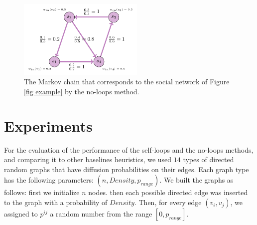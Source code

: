 \documentclass[sigconf,anonymous]{aamas}
\begin{document}
\begin{figure}[hbpt] 
    \centering
    \includegraphics[width= 6cm]{no_loop_markov_chain.pdf}
  \caption{The Markov chain that corresponds to the social network of Figure \ref{fig example} by the no-loops method.
  }
    \label{fig no-loops mc}
\end{figure}


%















\section{Experiments}

For the evaluation of the performance of the self-loops and the no-loops methods, and comparing it to other baselines heuristics, we used $14$ types of directed random graphs that have diffusion probabilities on their edges. Each graph type has the following parameters: $(n, Density, p_{range})$. We built the graphs as follows: first we initialize $n$ nodes. then each possible directed edge was inserted to the graph with a probability of $Density$. Then, for every edge $(v_i,v_j)$, we assigned to $p^{ij}$ a random number from the range $[0,p_{range}]$.
\end{document}
